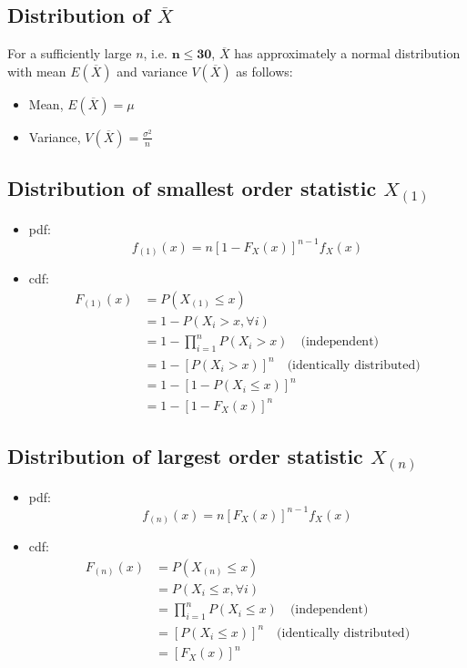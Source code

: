 \documentclass[a4paper]{article}
\begin{document}
\subsection{Distribution of \texorpdfstring{$\overline{X}$}{Xbar}}
For a sufficiently large $n$, i.e. $\mathbf{n \leq 30}$, $\overline{X}$ has approximately a normal distribution with mean $E(\overline{X})$ and variance $V(\overline{X})$ as follows:
\begin{itemize}
    \item Mean, $E(\overline{X}) = \mu$
    \item Variance, $\displaystyle V(\overline{X}) = \frac{\sigma^2}{n}$
\end{itemize}
\subsection{Distribution of smallest order statistic \texorpdfstring{$X_{(1)}$}{X(1)}}
\begin{itemize}
    \item pdf:
    $$f_{(1)}(x) = n\left[1-F_{X}(x)\right]^{n-1}f_{X}(x)$$
    \item cdf: \begin{align*}
    F_{(1)}(x) &= P(X_{(1)}\leq x)\\
    &= 1 - P(X_{i}> x, \forall i)\\
    &= 1 - \prod_{i=1}^{n}P(X_{i}> x) \quad \text{(independent)}\\
    &= 1 - \left[P(X_{i}> x)\right]^{n} \quad \text{(identically distributed)}\\
    &= 1-\left[1-P(X_{i}\leq x)\right]^{n}\\
    &= 1-\left[1-F_{X}(x)\right]^{n}
\end{align*}
\end{itemize}
\subsection{Distribution of largest order statistic \texorpdfstring{$X_{(n)}$}{X(n)}}
\begin{itemize}
    \item pdf:
    $$f_{(n)}(x) = n\left[F_{X}(x)\right]^{n-1}f_{X}(x)$$
    \item cdf: \begin{align*}
    F_{(n)}(x) &= P(X_{(n)}\leq x)\\
    &= P(X_{i}\leq x, \forall i)\\
    &= \prod_{i=1}^{n}P(X_{i}\leq x) \quad \text{(independent)}\\
    &= \left[P(X_{i}\leq x)\right]^{n} \quad \text{(identically distributed)}\\
    &= \left[F_{X}(x)\right]^{n}
\end{align*}
\end{itemize}
\end{document}
